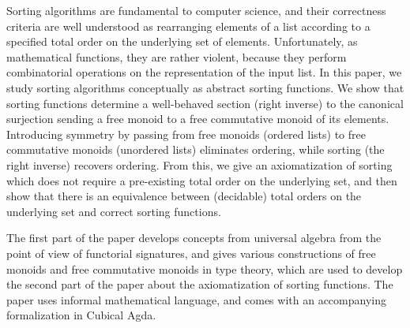 
Sorting algorithms are fundamental to computer science,
and their correctness criteria are well understood as
rearranging elements of a list according to a specified total order on the underlying set of elements.
Unfortunately, as mathematical functions, they are rather violent,
because they perform combinatorial operations on the representation of the input list.
In this paper, we study sorting algorithms conceptually as abstract sorting functions.
We show that sorting functions determine a well-behaved section (right inverse)
to the canonical surjection sending a free monoid to a free commutative monoid of its elements.
Introducing symmetry by passing from free monoids (ordered lists) to free commutative monoids (unordered lists)
eliminates ordering, while sorting (the right inverse) recovers ordering.
From this, we give an axiomatization of sorting which does not require a
pre-existing total order on the underlying set, and then show that there is an
equivalence between (decidable) total orders on the underlying set and correct
sorting functions.

The first part of the paper develops concepts from universal algebra from the point of view of functorial signatures,
and gives various constructions of free monoids and free commutative monoids in type theory,
which are used to develop the second part of the paper about the axiomatization of sorting functions.
The paper uses informal mathematical language, and comes with an accompanying formalization in Cubical Agda.
